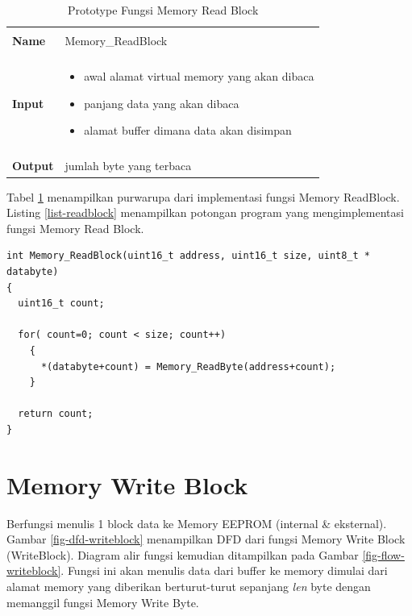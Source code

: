 \begin{table}[!h]
  \centering
  \begin{tabular}{p{2cm} p{8cm}}
    \hline\\
    {\bf Name} & Memory\_ReadBlock\\
    \hline\\
    {\bf Input} & 
    \begin{itemize}[noitemsep,topsep=0pt,parsep=0pt,partopsep=0pt]
    \item awal alamat virtual memory yang akan dibaca
    \item panjang data yang akan dibaca
    \item alamat buffer dimana data akan disimpan
    \end{itemize}
    \\
    \hline\\
    {\bf Output} & jumlah byte yang terbaca
    \\
    \hline
  \end{tabular}
  \caption{Prototype Fungsi Memory Read Block}
  \label{tabel-readblock}
\end{table}

Tabel \ref{tabel-readblock} menampilkan purwarupa dari implementasi fungsi Memory ReadBlock. Listing \ref{list-readblock} menampilkan potongan program yang mengimplementasi fungsi Memory Read Block.

\begin{lstlisting}[caption={Listing Program Fungsi Memory Read Block}, label={list-readblock}]
int Memory_ReadBlock(uint16_t address, uint16_t size, uint8_t * databyte)
{
  uint16_t count;

  for( count=0; count < size; count++)
    {
      *(databyte+count) = Memory_ReadByte(address+count);
    }

  return count;
}
\end{lstlisting}

\section{Memory Write Block}
\label{sec_memorywriteblock}

Berfungsi menulis 1 block data ke Memory EEPROM (internal & eksternal). Gambar \ref{fig-dfd-writeblock} menampilkan DFD dari fungsi Memory Write Block (WriteBlock). Diagram alir fungsi kemudian ditampilkan pada Gambar \ref{fig-flow-writeblock}. Fungsi ini akan menulis data dari buffer ke memory dimulai dari alamat memory yang diberikan berturut-turut sepanjang \emph{len} byte dengan memanggil fungsi Memory Write Byte.

